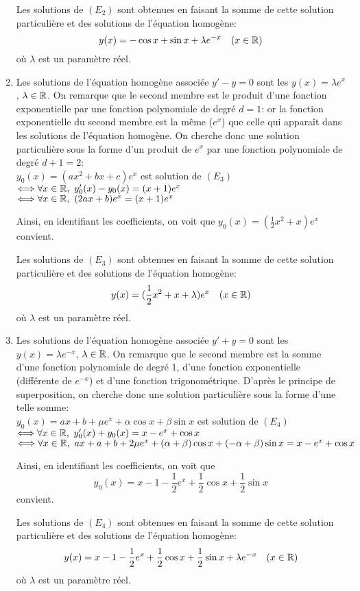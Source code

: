 \documentclass[11pt,a4paper]{article}
\begin{document}
\begin{enumerate}
Les solutions de $(E_2)$ sont obtenues en faisant la somme de cette solution particulière et des solutions 
de l'équation homogène:
$$y(x)=-\cos x+\sin x+\lambda e^{-x}\quad (x\in\mathbb{R})$$
où $\lambda$ est un paramètre réel.
\item Les solutions de l'équation homogène associée $y'-y=0$ sont les $y(x)=\lambda e^{x}$, $\lambda\in\mathbb{R}$. On remarque que le second membre est le produit d'une fonction exponentielle par une fonction polynomiale de degré $d=1$: or la fonction exponentielle du second membre est la m\^eme ($e^x$) que celle qui appara\^it dans les solutions de l'équation homogène. On cherche donc une solution particulière sous la forme d'un produit de $e^x$ par une fonction polynomiale de degré $d+1=2$:\\
$y_0(x)=(ax^2+bx+c)e^x$ est solution de $(E_3)$ \\
$\Longleftrightarrow \forall x\in\R,\ y_0'(x)-y_0(x)=(x+1)e^x$ \\
$\Longleftrightarrow \forall x\in\R,\ (2ax+b)e^x=(x+1)e^x$ 

\noindent Ainsi, en identifiant les coefficients, on voit que $y_0(x)=(\frac{1}{2}x^2+x)e^x$ convient.

Les solutions de $(E_3)$ sont obtenues en faisant la somme de cette solution particulière et des solutions de l'équation homogène: 
$$y(x)=(\frac{1}{2}x^2+x+\lambda)e^{x}\quad (x\in\mathbb{R})$$
où $\lambda$ est un paramètre réel.
\item Les solutions de l'équation homogène associée $y'+y=0$ sont les $y(x)=\lambda e^{-x}$, $\lambda\in\mathbb{R}$. On remarque que le second membre est la somme d'une fonction polynomiale de degré 1, d'une fonction exponentielle (différente de $e^{-x}$) et d'une fonction trigonométrique. D'après le principe de superposition, on cherche donc une solution particulière sous la forme d'une telle somme:\\
$y_0(x)=ax+b+\mu e^x+\alpha\cos x+\beta\sin x$ est solution de $(E_4)$ \\
$\Longleftrightarrow \forall x\in\R,\ y_0'(x)+y_0(x)=x-e^x+\cos x$ \\
$\Longleftrightarrow \forall x\in\R,\ ax+a+b+2\mu e^x+(\alpha+\beta)\cos x+(-\alpha +\beta)\sin x=x-e^x+\cos x$ 

\noindent Ainsi, en identifiant les coefficients, on voit que $$y_0(x)=x-1-\frac{1}{2}e^x+\frac{1}{2}\cos x+\frac{1}{2}\sin x$$ convient.

Les solutions de $(E_4)$ sont obtenues en faisant la somme de cette solution particulière et des solutions de l'équation homogène:
$$y(x)=x-1-\frac{1}{2}e^x+\frac{1}{2}\cos x+\frac{1}{2}\sin x+\lambda e^{-x}\quad (x\in\mathbb{R})$$
où $\lambda$ est un paramètre réel.
\end{enumerate}
\end{document}
